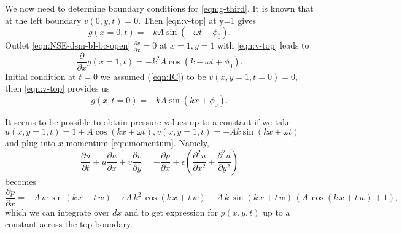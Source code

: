 \documentclass{article}
\numberwithin{equation}{section}
\begin{document}
We now need to determine boundary conditions for \cref{eqn:g-third}. It is known that at the left boundary $v(0,y,t)=0$. Then \cref{eqn:v-top}  at y=1 gives 
\begin{equation}
	g(x=0,t)=-kA\sin\left(-\omega t + \phi_0   \right).
\end{equation}
Outlet \cref{eqn:NSE-dsm-bl-bc-open} $\frac{\partial v}{\partial x}=0$ at $x=1,y=1$ with \cref{eqn:v-top} leads to 
\begin{equation}
	\frac{\partial }{\partial x}g(x=1,t)=-k^2A\cos\left( k -\omega t + \phi_0   \right).
\end{equation}
Initial condition at $t=0$ we assumed (\cref{eqn:IC}) to be $v(x,y=1,t=0)=0$, then \cref{eqn:v-top} provides us
\begin{equation}
	g(x,t=0)=-kA\sin\left( kx + \phi_0   \right).
\end{equation}


It seems to be possible to obtain pressure values up to a constant if we take $u(x,y=1,t)=1+A\cos(kx+\omega t), v(x,y=1,t)=-Ak\sin(kx+\omega t)$ and plug into $x$-momentum \cref{eqn:momentum}. Namely,
\begin{equation}
	\frac{\partial u}{\partial t}+u\frac{\partial u}{\partial x}+v\frac{\partial v}{\partial y}=-\frac{\partial p}{\partial x}+\epsilon \left( \frac{\partial ^2 u}{\partial x^2}+\frac{\partial ^ 2 u}{\partial y^2} \right)
\end{equation}
becomes
\begin{equation}
	\frac{\partial p}{\partial x}=-A\,w\,\sin\left(k\,x+t\,w\right)+\epsilon{A\,k^2\,\cos\left(k\,x+t\,w\right)}-A\,k\,\sin\left(k\,x+t\,w\right)\,\left(A\,\cos\left(k\,x+t\,w\right)+1\right),
\end{equation}
which we can integrate over $dx$ and to get expression for $p(x,y,t)$ up to a constant across the top boundary.
\end{document}
